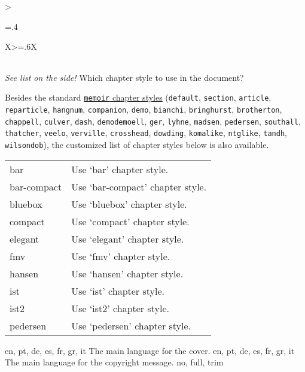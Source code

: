 {\begin{xltabular}{\linewidth}{>{\hsize=.4\hsize\raggedright\arraybackslash}X>{\hsize=.6\hsize}X}
{\begin{tabular}{@{}l@{ $\rightarrow$ }X@{}}
    \end{tabular}
    }
	    \midrule
	    {\emph{See list on the side!}}%
	    {Which chapter style to use in the document?}%
	{%
	Besides the standard \href{https://tug.ctan.org/info/MemoirChapStyles/MemoirChapStyles.pdf}{\texttt{memoir} chapter styles} (\texttt{default}, \texttt{section}, \texttt{article}, \texttt{reparticle}, \texttt{hangnum}, \texttt{companion}, \texttt{demo}, \texttt{bianchi}, \texttt{bringhurst}, \texttt{brotherton}, \texttt{chappell}, \texttt{culver}, \texttt{dash}, \texttt{demodemoell}, \texttt{ger}, \texttt{lyhne}, \texttt{madsen}, \texttt{pedersen}, \texttt{southall}, \texttt{thatcher}, \texttt{veelo}, \texttt{verville}, \texttt{crosshead}, \texttt{dowding}, \texttt{komalike}, \texttt{ntglike}, \texttt{tandh}, \texttt{wilsondob}), the customized list of chapter styles below is also available.
	    \begin{tabular}{@{}l@{ $\rightarrow$ }X@{}}
		bar 		& Use `bar' chapter style. \\
		bar-compact	& Use `bar-compact' chapter style.\\
		bluebox 	& Use `bluebox' chapter style.\\
		compact 	& Use `compact' chapter style.\\
		elegant 	& Use `elegant' chapter style.\\
		fmv 		& Use `fmv' chapter style.\\
		hansen 		& Use `hansen' chapter style.\\
		ist 		& Use `ist' chapter style.\\
		ist2 		& Use `ist2' chapter style.\\
		pedersen 	& Use `pedersen' chapter style.\\
	    \end{tabular}
	    }
    \midrule
    {en, pt, de, es, fr, gr, it}%
    {The main language for the cover.}%
	{%
    }
    \midrule
    {en, pt, de, es, fr, gr, it}%
    {The main language for the copyright message.}%
	{%
    }
    \midrule
    {no, full, trim}%

\end{xltabular}}
